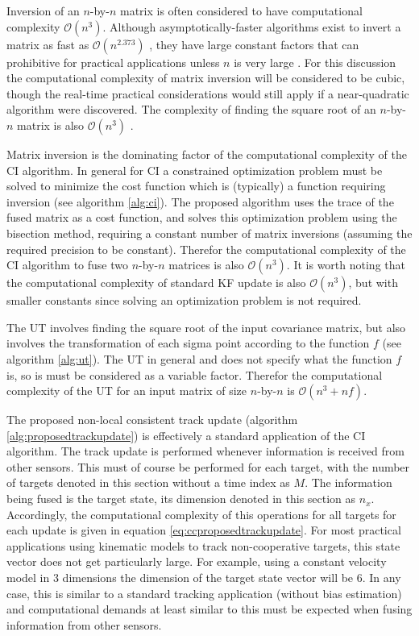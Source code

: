 \documentclass[journal]{IEEEtran}
\begin{document}
Inversion of an $n$-by-$n$ matrix is often considered to have computational complexity $\mathcal{O}(n^3)$. Although asymptotically-faster algorithms exist to invert a matrix as fast as $\mathcal{O}(n^{2.373})$ \cite{williams2012multiplying}, they have large constant factors that can prohibitive for practical applications unless $n$ is very large \cite{smirnov2013bilinear}. For this discussion the computational complexity of matrix inversion will be considered to be cubic, though the real-time practical considerations would still apply if a near-quadratic algorithm were discovered. The complexity of finding the square root of an $n$-by-$n$ matrix is also $\mathcal{O}(n^3)$ \cite{higham1987computing}.

Matrix inversion is the dominating factor of the computational complexity of the CI algorithm. In general for CI a constrained optimization problem must be solved to minimize the cost function which is (typically) a function requiring inversion (see algorithm \ref{alg:ci}). The proposed algorithm uses the trace of the fused matrix as a cost function, and solves this optimization problem using the bisection method, requiring a constant number of matrix inversions (assuming the required precision to be constant). Therefor the computational complexity of the CI algorithm to fuse two $n$-by-$n$ matrices is also $\mathcal{O}(n^3)$. It is worth noting that the computational complexity of standard KF update is also $\mathcal{O}(n^3)$, but with smaller constants since solving an optimization problem is not required.

The UT involves finding the square root of the input covariance matrix, but also involves the transformation of each sigma point according to the function $f$ (see algorithm \ref{alg:ut}). The UT in general and does not specify what the function $f$ is, so is must be considered as a variable factor. Therefor the computational complexity of the UT for an input matrix of size $n$-by-$n$ is $\mathcal{O}(n^3 + nf)$.

The proposed non-local consistent track update (algorithm \ref{alg:proposedtrackupdate}) is effectively a standard application of the CI algorithm. The track update is performed whenever information is received from other sensors. This must of course be performed for each target, with the number of targets denoted in this section without a time index as $M$. The information being fused is the target state, its dimension denoted in this section as $n_{x}$. Accordingly, the computational complexity of this operations for all targets for each update is given in equation \ref{eq:ccproposedtrackupdate}. For most practical applications using kinematic models to track non-cooperative targets, this state vector does not get particularly large. For example, using a constant velocity model in 3 dimensions the dimension of the target state vector will be 6. In any case, this is similar to a standard tracking application (without bias estimation) and computational demands at least similar to this must be expected when fusing information from other sensors.
\end{document}
